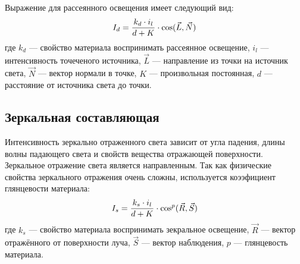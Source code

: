 Выражение для рассеянного освещения имеет следующий вид:
\begin{equation*}
    I_d = {{k_d \cdot i_l} \over {d + K}} \cdot \cos(\vec{L}, \vec{N})
\end{equation*}
где $k_d$ --- свойство материала воспринимать рассеянное освещение, $i_l$ --- интенсивность точеченого источника, $\vec{L}$ --- направление из точки на источник света, $\vec{N}$ --- вектор нормали в точке, $K$ --- произвольная постоянная, $d$ --- расстояние от источника света до точки.

\subsection*{Зеркальная составляющая}
Интенсивность зеркально отраженного света зависит от угла падения, длины волны падающего света и свойств вещества отражающей поверхности. Зеркальное отражение света является направленным. Так как физические свойства зеркального отражения очень сложны, используется коээфициент глянцевости материала:
\begin{equation*}
    I_s = {{k_s \cdot i_l} \over {d + K}} \cdot {\cos ^ p}(\vec{R}, \vec{S})
\end{equation*}
где $k_s$ --- свойство материала воспринимать зекральное освещение, $\vec{R}$ --- вектор отражённого от поверхности луча, $\vec{S}$ --- вектор наблюдения, $p$ --- глянцевость материала.
\pagebreak
